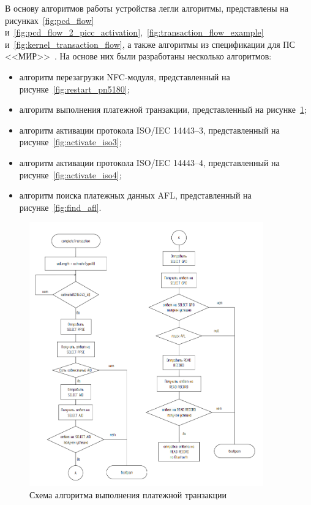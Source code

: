 
В основу алгоритмов работы устройства легли алгоритмы, представлены на рисунках~\ref{fig:pcd_flow} и~\ref{fig:pcd_flow_2_picc_activation},~\ref{fig:transaction_flow_example} и~\ref{fig:kernel_transaction_flow}, а также алгоритмы из спецификации для ПС <<МИР>>~\cite{book_mir}.
На основе них были разработаны несколько алгоритмов:

\begin{itemize}
    \item алгоритм перезагрузки NFC-модуля, представленный на рисунке~\ref{fig:restart_pn5180};
    \item алгоритм выполнения платежной транзакции, представленный на рисунке~\ref{fig:complete_transaction};
    \item алгоритм активации протокола ISO/IEC 14443--3, представленный на рисунке~\ref{fig:activate_iso3};
    \item алгоритм активации протокола ISO/IEC 14443--4, представленный на рисунке~\ref{fig:activate_iso4};
    \item алгоритм поиска платежных данных AFL, представленный на рисунке~\ref{fig:find_afl}.
\end{itemize}


\begin{figure}[H]
    \centering
    \includegraphics[width=0.9\textwidth]{images/design/complete_transaction}
    \caption{\centering Схема алгоритма выполнения платежной транзакции}
    \label{fig:complete_transaction}
\end{figure}

